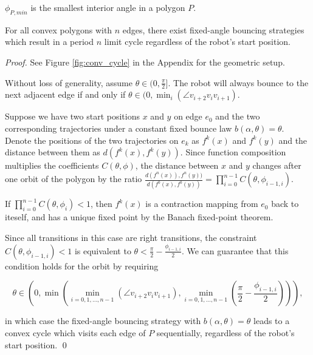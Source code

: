 \documentclass[]{styles/svproc}  %
\begin{document}

\begin{definition}
$\phi_{P,min}$ is the smallest interior angle in a polygon $P$.
\end{definition}

\begin{theorem} \label{thm:convex}
For all convex polygons with $n$ edges, there exist fixed-angle bouncing
strategies which result in a period $n$ limit cycle regardless of the robot's start position.
\end{theorem}
\begin{proof}
See Figure \ref{fig:conv_cycle} in the Appendix for the geometric setup.

Without loss of generality, assume $\theta \in (0, \frac{\pi}{2}]$. The robot will always bounce
to the next adjacent edge if and only if
$\theta \in (0, \min_{i}(\angle v_{i+2}v_{i}v_{i+1})$.

Suppose we have two start positions $x$ and $y$ on edge $e_0$ and the two
corresponding trajectories under a constant fixed bounce law $b(\alpha, \theta) = \theta$. Denote the positions of the two trajectories on $e_k$ as $f^{k}(x)$ and
$f^{k}(y)$ and the distance between them as $d(f^{k}(x), f^{k}(y))$. Since function composition multiplies the coefficients $C(\theta, \phi)$, 
the distance between $x$ and $y$ changes after one orbit of the polygon by the
ratio $\frac{d(f^{n}(x)), f^{n}(y))}{d(f^{0}(x), f^{0}(y))} = \prod_{i = 0}^{n-1}
C(\theta, \phi_{i-1, i})$.

If $\prod_{i = 0}^{n-1} C(\theta, \phi_{i}) < 1$, then $f^k(x)$ is a contraction
mapping from $e_0$ back to iteself, and has a unique fixed point by the Banach fixed-point theorem\cite{Granas2003}.

Since all transitions in this case are right transitions, the constraint \\$C(\theta,\phi_{i-1, i})<1$ is equivalent to $\theta < \frac{\pi}{2}-\frac{\phi_{i-1, i}}{2}$. We can guarantee that this condition holds for the orbit by requiring

\begin{equation*}
\theta \in (0, \min(\min_{i = 0, 1, \dots, n-1}(\angle v_{i+2}v_{i}v_{i+1}),
\min_{i = 0, 1, \dots, n-1}(\frac{\pi}{2}-\frac{\phi_{i-1, i}}{2}))),
\end{equation*}

\noindent
in which case the fixed-angle bouncing strategy with $b(\alpha, \theta) = \theta$ leads to a convex
cycle which visits each edge of $P$ sequentially, regardless of the robot's start position.
\qed

\end{proof}
\end{document}
